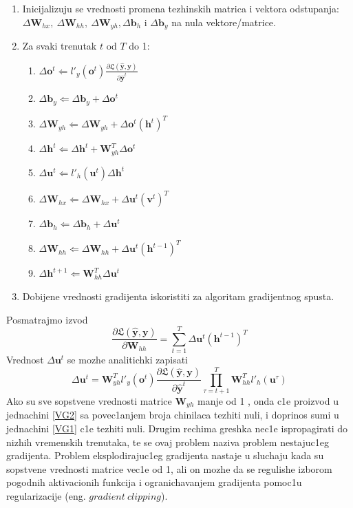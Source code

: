 \documentclass[a4paper, openany, oneside, 11pt]{book}
\begin{document}
\begin{enumerate}
\item Inicijalizuju se vrednosti promena tezhinskih matrica i vektora odstupanja: $\Delta\mathbf{W}_{hx},\ \Delta\mathbf{W}_{hh},\ \Delta\mathbf{W}_{yh}, \Delta\mathbf{b}_h$  i $\Delta\mathbf{b}_y$ na nula vektore/matrice.
\item Za svaki trenutak $t$ od $T$ do 1:
\begin{enumerate}
\item  $\Delta\mathbf{o}^t \Leftarrow l'_y(\mathbf{o}^t)\frac{\partial\mathfrak{L}(\mathbf{\hat{y}},\mathbf{y})}{\partial\mathbf{\hat{y}}^t}$
\item $\Delta\mathbf{b}_y \Leftarrow \Delta\mathbf{b}_y+\Delta\mathbf{o}^t$
\item $\Delta\mathbf{W}_{yh} \Leftarrow \Delta\mathbf{W}_{yh}+\Delta\mathbf{o}^t(\mathbf{h}^t)^T$
\item $\Delta\mathbf{h}^t \Leftarrow \Delta\mathbf{h}^t+\mathbf{W}_{yh}^T\Delta\mathbf{o}^t$
\item $\Delta\mathbf{u}^t \Leftarrow l'_h(\mathbf{u}^t)\Delta\mathbf{h}^t$
\item $\Delta\mathbf{W}_{hx} \Leftarrow \Delta\mathbf{W}_{hx}+\Delta\mathbf{u}^t(\mathbf{v}^t)^T$
\item $\Delta\mathbf{b}_h \Leftarrow \Delta\mathbf{b}_h + \Delta\mathbf{u}^t$
\item $\Delta\mathbf{W}_{hh} \Leftarrow \Delta\mathbf{W}_{hh}+\Delta\mathbf{u}^t(\mathbf{h}^{t-1})^T$
\item $\Delta\mathbf{h}^{t+1} \Leftarrow \mathbf{W}_{hh}^T\Delta\mathbf{u}^t  $
\end{enumerate}
\item Dobijene vrednosti gradijenta iskoristiti za algoritam gradijentnog spusta.
\end{enumerate}
Posmatrajmo izvod
\begin{equation}\label{VG1}
\frac{\partial\mathfrak{L}(\mathbf{\hat{y}},\mathbf{y})}{\partial \mathbf{W}_{hh}} = \sum^{T}_{t=1}\Delta\mathbf{u}^t(\mathbf{h}^{t-1})^T
\end{equation}
Vrednost $\Delta\mathbf{u}^t $ se mozhe analitichki zapisati
\begin{equation}\label{VG2}
\Delta\mathbf{u}^t = \mathbf{W}_{yh}^T l'_y(\mathbf{o}^t)\frac{\partial\mathfrak{L}(\mathbf{\hat{y}},\mathbf{y})}{\partial\mathbf{\hat{y}}^t}\prod^T_{\tau=t+1}\mathbf{W}_{hh}^Tl'_h(\mathbf{u}^{\tau})
\end{equation}
Ako su sve sopstvene vrednosti matrice $\mathbf{W}_{yh}$ manje od 1 , onda c1e proizvod u jednachini \ref{VG2} sa povec1anjem broja chinilaca tezhiti nuli, i doprinos sumi u jednachini \ref{VG1} c1e tezhiti nuli. Drugim rechima greshka nec1e ispropagirati do nizhih vremenskih trenutaka, te se ovaj problem naziva problem nestajuc1eg gradijenta. Problem eksplodirajuc1eg gradijenta nastaje u sluchaju kada su sopstvene vrednosti matrice vec1e od 1, ali on mozhe da se regulishe izborom pogodnih aktivacionih funkcija i ogranichavanjem gradijenta pomoc1u regularizacije (eng. $gradient\ clipping$).\\
\end{document}
